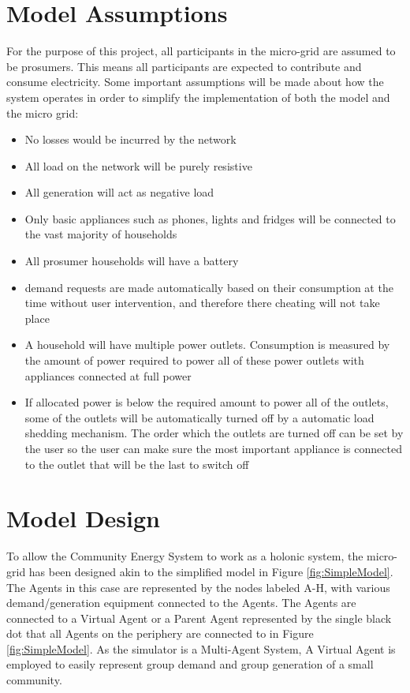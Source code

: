 \section*{Model Assumptions}
For the purpose of this project, all participants in the micro-grid are assumed to be prosumers. This means all participants are expected to contribute and consume electricity. Some important assumptions will be made about how the system operates in order to simplify the implementation of both the model and the micro grid:
\begin{itemize}
	\item No losses would be incurred by the network
	\item All load on the network will be purely resistive
	\item All generation will act as negative load
	\item Only basic appliances such as phones, lights and fridges will be connected to the vast majority of households 
	\item All prosumer households will have a battery
	\item demand requests are made automatically based on their consumption at the time without user intervention, and therefore there cheating will not take place
	\item A household will have multiple power outlets. Consumption is measured by the amount of power required to power all of these power outlets with appliances connected at full power
	\item If allocated power is below the required amount to power all of the outlets, some of the outlets will be automatically turned off by a automatic load shedding mechanism. The order which the outlets are turned off can be set by the user so the user can make sure the most important appliance is connected to the outlet that will be the last to switch off
\end{itemize}

\section*{Model Design}
To allow the Community Energy System to work as a holonic system, the micro-grid has been designed akin to the simplified model in Figure \ref{fig:SimpleModel}. The Agents in this case are represented by the nodes labeled A-H, with various demand/generation equipment connected to the Agents. The Agents are connected to a Virtual Agent or a Parent Agent represented by the single black dot that all Agents on the periphery are connected to in Figure \ref{fig:SimpleModel}. As the simulator is a Multi-Agent System, A Virtual Agent is employed to easily represent group demand and group generation of a small community.

